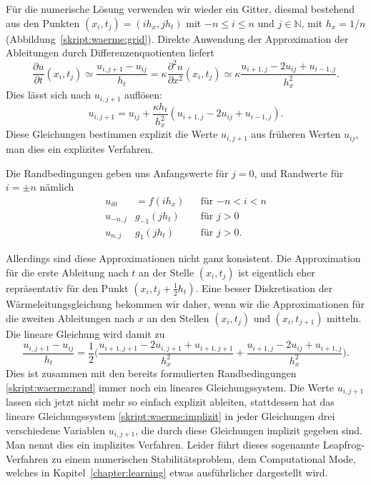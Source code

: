 Für die numerische Lösung verwenden wir wieder ein Gitter, diesmal bestehend
aus den Punkten $(x_i, t_j)=(ih_x, jh_t)$ mit $-n \le i \le n$ und
$j\in\mathbb N$, mit $h_x=1/n$ (Abbildung~\ref{skript:waerme:grid}).
Direkte Anwendung der Approximation der Ableitungen durch
Differenzenquotienten liefert
\begin{equation}
\frac{\partial u}{\partial t}(x_i,t_j)
\simeq
\frac{u_{i,j+1}-u_{ij}}{h_t}
=
\kappa
\frac{\partial^2u}{\partial x^2}(x_i,t_j)
\simeq
\kappa
\frac{u_{i+1,j}-2u_{ij}+u_{i-1,j}}{h_x^2}.
\end{equation}
Dies lässt sich nach $u_{i,j+1}$ auflösen:
\[
u_{i,j+1}
=
u_{ij}
+
\frac{\kappa h_t}{h_x^2} (u_{i+1,j}-2u_{ij}+u_{i-1,j}).
\]
Diese Gleichungen bestimmen explizit die Werte $u_{i,j+1}$ aus früheren Werten
$u_{ij}$, man dies ein explizites Verfahren.

Die Randbedingungen geben uns Anfangswerte für $j=0$, und Randwerte
für $i=\pm n$ nämlich
\begin{equation}
\begin{aligned}
u_{i0} &= f(ih_x)&&\text{für $-n<i<n$}\\
u_{-n,j} & g_{-1}(jh_t)&&\text{für $j>0$}\\
u_{n,j} & g_{1}(jh_t)&&\text{für $j>0$.}
\end{aligned}
\label{skript:waerme:rand}
\end{equation}

Allerdings sind diese Approximationen nicht ganz konsistent.
Die Approximation für die erste Ableitung nach $t$ an der Stelle
$(x_i,t_j)$ ist eigentlich eher repräsentativ für den Punkt
$(x_i,t_j+\frac12h_t)$.
Eine besser Diskretisation der Wärmeleitungsgleichung bekommen wir daher,
wenn wir die Approximationen für die zweiten Ableitungen nach $x$ an
den Stellen $(x_i,t_j)$  und $(x_i,t_{j+1})$ mitteln. 
Die lineare Gleichung wird damit zu
\begin{equation}
\frac{u_{i,j+1}-u_{ij}}{h_t}
=
\frac12\biggl(
\frac{u_{i+1,j+1}-2u_{i,j+1}+u_{i+1,j+1}}{h_x^2}
+
\frac{u_{i+1,j}-2u_{ij}+u_{i+1,j}}{h_x^2}
\biggr).
\label{skript:waerme:implizit}
\end{equation}
Dies ist zusammen mit den bereits formulierten Randbedingungen
\eqref{skript:waerme:rand}
immer noch ein lineares Gleichungssystem.
Die Werte $u_{i,j+1}$ lassen sich jetzt nicht mehr so einfach
explizit ableiten, stattdessen hat das lineare Gleichungssystem
\eqref{skript:waerme:implizit}
in jeder Gleichungen drei verschiedene Variablen $u_{i,j+1}$,
die durch diese Gleichungen implizit gegeben sind.
Man nennt dies ein implizites Verfahren.
Leider führt dieses sogenannte Leapfrog-Verfahren zu einem numerischen
Stabilitätsproblem, dem Computational Mode, welches in
Kapitel~\ref{chapter:learning} etwas ausführlicher dargestellt wird.

